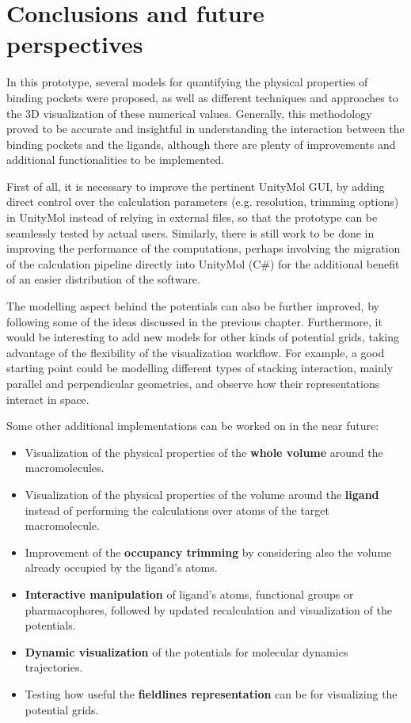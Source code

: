 \chapter{Conclusions and future perspectives} %
In this prototype, several models for quantifying the physical properties of binding pockets were proposed, as well as different techniques and approaches to the 3D visualization of these numerical values. Generally, this methodology proved to be accurate and insightful in understanding the interaction between the binding pockets and the ligands, although there are plenty of improvements and additional functionalities to be implemented.

First of all, it is necessary to improve the pertinent UnityMol GUI, by adding direct control over the calculation parameters (e.g. resolution, trimming options) in UnityMol instead of relying in external files, so that the prototype can be seamlessly tested by actual users. Similarly, there is still work to be done in improving the performance of the computations, perhaps involving the migration of the calculation pipeline directly into UnityMol (C\#) for the additional benefit of an easier distribution of the software.

The modelling aspect behind the potentials can also be further improved, by following some of the ideas discussed in the previous chapter. Furthermore, it would be interesting to add new models for other kinds of potential grids, taking advantage of the flexibility of the visualization workflow. For example, a good starting point could be modelling different types of stacking interaction, mainly parallel and perpendicular geometries, and observe how their representations interact in space.

Some other additional implementations can be worked on in the near future:
\begin{itemize}
  \item Visualization of the physical properties of the \textbf{whole volume} around the macromolecules.
  \item Visualization of the physical properties of the volume around the \textbf{ligand} instead of performing the calculations over atoms of the target macromolecule.
  \item Improvement of the \textbf{occupancy trimming} by considering also the volume already occupied by the ligand's atoms.
  \item \textbf{Interactive manipulation} of ligand's atoms, functional groups or pharmacophores, followed by updated recalculation and visualization of the potentials.
  \item \textbf{Dynamic visualization} of the potentials for molecular dynamics trajectories.
  \item Testing how useful the \textbf{fieldlines representation} can be for visualizing the potential grids.
\end{itemize}
